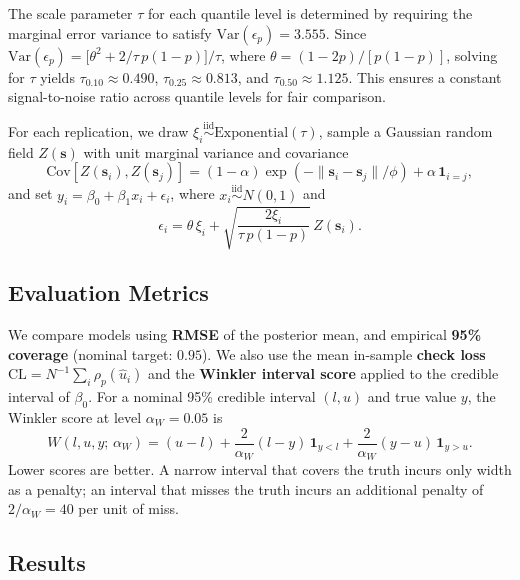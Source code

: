 \documentclass[twoside]{article}
\numberwithin{equation}{section}
\begin{document}
	The scale parameter $\tau$ for each quantile level is
	determined by requiring the marginal error variance to satisfy
	$\mathrm{Var}(\epsilon_p) = 3.555$. Since
	$\mathrm{Var}(\epsilon_p) =
	\bigl[\theta^2 + {2}/{\tau\,p(1-p)}\bigr]/\tau$,
	where $\theta = (1-2p)/[p(1-p)]$, solving for $\tau$ yields
	$\tau_{0.10} \approx 0.490$, $\tau_{0.25} \approx 0.813$, and
	$\tau_{0.50} \approx 1.125$.
	This ensures a constant signal-to-noise ratio across quantile levels
	for fair comparison.
	
	For each replication, we draw $\xi_i \stackrel{\mathrm{iid}}{\sim}
	\mathrm{Exponential}(\tau)$, sample a Gaussian random field
	$Z(\mathbf{s})$ with unit marginal variance and covariance
	\begin{equation*}
		\mathrm{Cov}[Z(\mathbf{s}_i),Z(\mathbf{s}_j)]
		= (1-\alpha)
		\exp\!\left(-\|\mathbf{s}_i-\mathbf{s}_j\|/\phi\right)
		+ \alpha \, \mathbf{1}_{i=j},
	\end{equation*}
	and set $y_i = \beta_0 + \beta_1 x_i + \epsilon_i$, where
	$x_i \stackrel{\mathrm{iid}}{\sim} N(0,1)$ and
	\begin{equation*}
		\epsilon_i = \theta\,\xi_i
		+ \sqrt{\frac{2\xi_i}{\tau\,p(1-p)}}\,Z(\mathbf{s}_i).
	\end{equation*}
	
	\subsection{Evaluation Metrics}
	
	We compare models using \textbf{RMSE} of the
	posterior mean, and empirical \textbf{95\% coverage}
	(nominal target: $0.95$).
	We also use the mean in-sample \textbf{check loss}
	$\mathrm{CL} = N^{-1}\sum_i \rho_p(\hat{u}_i)$
	\citep{KoenkerBassett1978} and the \textbf{Winkler interval score}
	\citep{Winkler1972} applied to the credible interval of $\beta_0$.
	For a nominal 95\% credible interval $(l, u)$ and true value $y$,
	the Winkler score at level $\alpha_W = 0.05$ is
	\begin{equation}
		W(l,u,y;\,\alpha_W)
		= (u - l)
		+ \frac{2}{\alpha_W}(l - y)\,\mathbf{1}_{y < l}
		+ \frac{2}{\alpha_W}(y - u)\,\mathbf{1}_{y > u}.
		\label{eq:Winkler}
	\end{equation}
	Lower scores are better. A narrow interval that covers the truth incurs
	only width as a penalty; an interval that misses the truth incurs an
	additional penalty of $2/\alpha_W = 40$ per unit of miss.
	
	\subsection{Results}
	
\end{document}
